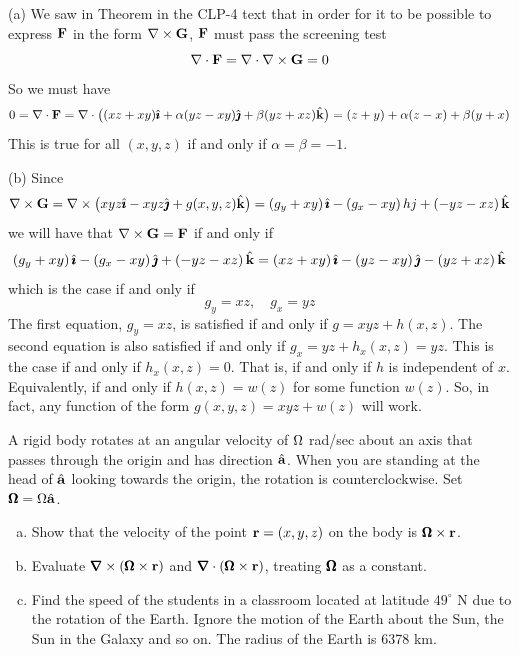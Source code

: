 \begin{solution} 
(a)
We saw in Theorem   in the CLP-4 text that 
in order for it to be possible to express $\mathbf{F}$ in the form $\nabla\times\mathbf{G}$,
$\mathbf{F}$ must pass the screening test
\begin{equation*}
\nabla\cdot \mathbf{F}=\nabla\cdot \nabla\times\mathbf{G}=0
\end{equation*}
So we must have
\begin{equation*}
0=\nabla\cdot\mathbf{F}=\nabla\cdot \big((xz+xy)\hat{\pmb{\imath}}+\alpha(yz-xy)\hat{\pmb{\jmath}}+\beta(yz+xz)\hat{\mathbf{k}}\big)
=(z+y)+\alpha(z-x)+\beta(y+x)
\end{equation*}
This is true for all $(x,y,z)$ if and only if $\alpha=\beta=-1$.

(b) Since
\begin{equation*}
\nabla\times\mathbf{G}=\nabla\times\big(xyz\hat{\pmb{\imath}}-xyz\hat{\pmb{\jmath}}+g(x,y,z)\hat{\mathbf{k}}\big)
=(g_y+xy)\,\hat{\pmb{\imath}}-(g_x-xy)\,hj+(-yz-xz)\,\hat{\mathbf{k}}
\end{equation*}
we will have that $\nabla\times\mathbf{G}=\mathbf{F}$ if and only if
\begin{equation*}
(g_y+xy)\,\hat{\pmb{\imath}}-(g_x-xy)\,\hat{\pmb{\jmath}}+(-yz-xz)\,\hat{\mathbf{k}}=(xz+xy)\,\hat{\pmb{\imath}}-(yz-xy)\,\hat{\pmb{\jmath}}-(yz+xz)\,\hat{\mathbf{k}}
\end{equation*}
which is the case if and only if
\begin{equation*}
g_y=xz,\quad g_x=yz
\end{equation*}
The first equation, $g_y=xz$, is satisfied if and only if $g=xyz+h(x,z)$.
The second equation is also satisfied if and only if
$g_x=yz+h_x(x,z)=yz$. This is the case if and only if $h_x(x,z)=0$. That
is, if and only if $h$ is independent of $x$. Equivalently, if and only
if $h(x,z)=w(z)$ for some function $w(z)$. So, in fact, any function of
the form $g(x,y,z)=xyz+w(z)$ will work.

\end{solution}


\begin{question}
A rigid body rotates at an angular velocity of $\Omega$ rad/sec
about an axis that passes through the origin and has direction $\hat{\mathbf{a}}$. When
you are standing at the head of $\hat{\mathbf{a}}$ looking towards the origin, the rotation
is counterclockwise. Set $\pmb{\Omega}=\Omega\hat{\mathbf{a}}$. 
\begin{enumerate}[(a)]  
\item
Show that the velocity of the point $\mathbf{r}=(x,y,z)$ on the body is $\pmb{\Omega}\times\mathbf{r}$.
\item
Evaluate $\vnabla\times(\vOm\times\vr)$ and  
$\vnabla\cdot(\vOm\times\vr)$, treating $\pmb{\Omega}$ as a constant.
\item
Find the speed of the students in a classroom located at
latitude $49^\circ$ N due to the rotation of the Earth. Ignore the motion
of the Earth about the Sun, the Sun in the Galaxy and so on. The radius
of the Earth is 6378 km.
\end{enumerate}
\end{question}

